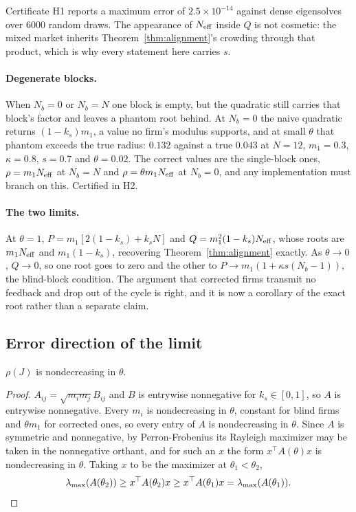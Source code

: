 Certificate H1 reports a maximum error of $2.5\times 10^{-14}$ against dense eigensolves over 6000 random draws. The appearance of $N_{\mathrm{eff}}$ inside $Q$ is not cosmetic: the mixed market inherits Theorem~\ref{thm:alignment}'s crowding through that product, which is why every statement here carries $s$.

\paragraph{Degenerate blocks.} When $N_b = 0$ or $N_b = N$ one block is empty, but the quadratic still carries that block's factor and leaves a phantom root behind. At $N_b = 0$ the naive quadratic returns $(1-k_s)m_1$, a value no firm's modulus supports, and at small $\theta$ that phantom exceeds the true radius: $0.132$ against a true $0.043$ at $N=12$, $m_1=0.3$, $\kappa=0.8$, $s=0.7$ and $\theta=0.02$. The correct values are the single-block ones, $\rho = m_1N_{\mathrm{eff}}$ at $N_b=N$ and $\rho = \theta m_1 N_{\mathrm{eff}}$ at $N_b=0$, and any implementation must branch on this. Certified in H2.

\paragraph{The two limits.} At $\theta = 1$, $P = m_1[2(1-k_s)+k_sN]$ and $Q = m_1^2(1-k_s)N_{\mathrm{eff}}$, whose roots are $m_1N_{\mathrm{eff}}$ and $m_1(1-k_s)$, recovering Theorem~\ref{thm:alignment} exactly. As $\theta \to 0$, $Q \to 0$, so one root goes to zero and the other to $P \to m_1(1+\kappa s(N_b-1))$, the blind-block condition. The argument that corrected firms transmit no feedback and drop out of the cycle is right, and it is now a corollary of the exact root rather than a separate claim.

\subsection{Error direction of the limit}

\begin{aproposition}
\label{aprop:theta}
$\rho(J)$ is nondecreasing in $\theta$.
\end{aproposition}

\begin{proof}
$A_{ij} = \sqrt{m_im_j}B_{ij}$ and $B$ is entrywise nonnegative for $k_s \in [0,1]$, so $A$ is entrywise nonnegative. Every $m_i$ is nondecreasing in $\theta$, constant for blind firms and $\theta m_1$ for corrected ones, so every entry of $A$ is nondecreasing in $\theta$. Since $A$ is symmetric and nonnegative, by Perron-Frobenius its Rayleigh maximizer may be taken in the nonnegative orthant, and for such an $x$ the form $x^{\top}A(\theta)x$ is nondecreasing in $\theta$. Taking $x$ to be the maximizer at $\theta_1 < \theta_2$,
\[
  \lambda_{\max}(A(\theta_2)) \geq x^{\top}A(\theta_2)x \geq x^{\top}A(\theta_1)x = \lambda_{\max}(A(\theta_1)). \qedhere
\]
\end{proof}

